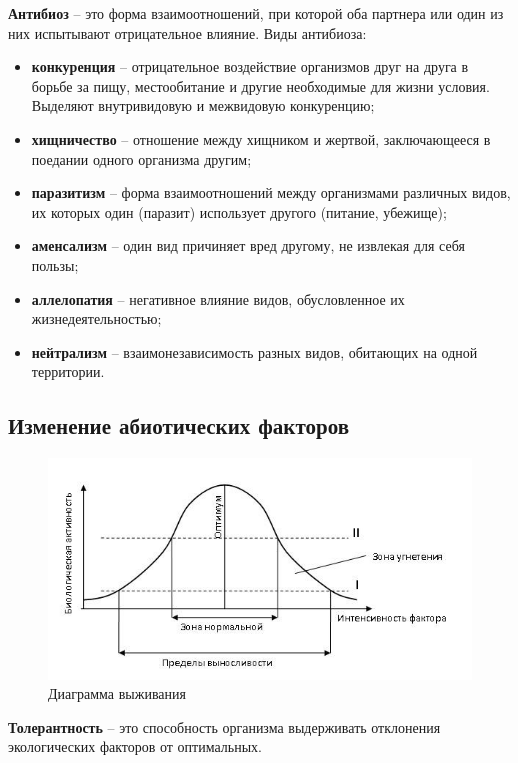 \documentclass[a5paper, 11pt]{extarticle}
\theoremstyle{definition}
\theoremstyle{definition}
\theoremstyle{definition}
\numberwithin{figure}{section}
\begin{document}
\textbf{Антибиоз} -- это форма взаимоотношений, при которой оба партнера или один из них испытывают отрицательное влияние. Виды антибиоза:
\begin{itemize}
    \item \textbf{конкуренция} -- отрицательное воздействие организмов друг на друга в борьбе за пищу, местообитание и другие необходимые для жизни условия. Выделяют внутривидовую и межвидовую конкуренцию;
    \item \textbf{хищничество} -- отношение между хищником и жертвой, заключающееся в поедании одного организма другим;
    \item \textbf{паразитизм} -- форма взаимоотношений между организмами различных видов, их которых один (паразит) использует другого (питание, убежище);
    \item \textbf{аменсализм} -- один вид причиняет вред другому, не извлекая для себя пользы;
    \item \textbf{аллелопатия} -- негативное влияние видов, обусловленное их жизнедеятельностью;
    \item \textbf{нейтрализм} -- взаимонезависимость разных видов, обитающих на одной территории.
\end{itemize}

\subsection{Изменение абиотических факторов}

\begin{figure}[H]
    \centering
    \includegraphics[width=\textwidth]{images/survive-diag.jpg}
    \caption{Диаграмма выживания}
\end{figure}

\textbf{Толерантность} -- это способность организма выдерживать отклонения экологических факторов от оптимальных.
\end{document}
